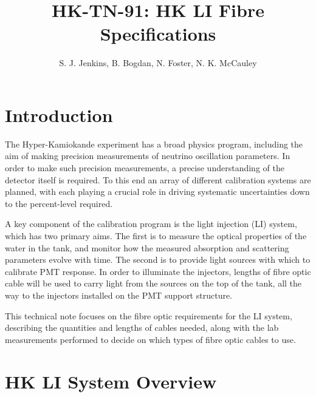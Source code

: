 \documentclass[a4paper,11pt]{article}
\begin{document}
\title{\huge{HK-TN-91: HK LI Fibre Specifications}}
\author{S. J. Jenkins, B. Bogdan, N. Foster, N. K. McCauley}

\maketitle

\tableofcontents

\newpage

\section{Introduction}\label{sec:intro}
The Hyper-Kamiokande experiment has a broad physics program, including the aim of making precision measurements of neutrino oscillation parameters. In order to make such precision measurements, a precise understanding of the detector itself is required. To this end an array of different calibration systems are planned, with each playing a crucial role in driving systematic uncertainties down to the percent-level required.

A key component of the calibration program is the light injection (LI) system, which has two primary aims. The first is to measure the optical properties of the water in the tank, and monitor how the measured absorption and scattering parameters evolve with time. The second is to provide light sources with which to calibrate PMT response. In order to illuminate the injectors, lengths of fibre optic cable will be used to carry light from the sources on the top of the tank, all the way to the injectors installed on the PMT support structure.

This technical note focuses on the fibre optic requirements for the LI system, describing the quantities and lengths of cables needed, along with the lab measurements performed to decide on which types of fibre optic cables to use.

\section{HK LI System Overview}\label{sec:overview}
\end{document}
